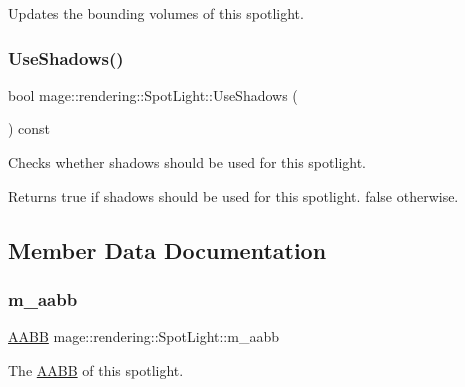 Updates the bounding volumes of this spotlight. \hypertarget{classmage_1_1rendering_1_1_spot_light_a5081e3b99bd869d6c241b48666917cd4}{}\label{classmage_1_1rendering_1_1_spot_light_a5081e3b99bd869d6c241b48666917cd4} 
\subsubsection{\texorpdfstring{Use\+Shadows()}{UseShadows()}}
{\footnotesize\ttfamily bool mage\+::rendering\+::\+Spot\+Light\+::\+Use\+Shadows (\begin{DoxyParamCaption}{ }\end{DoxyParamCaption}) const\hspace{0.3cm}{\ttfamily [noexcept]}}

Checks whether shadows should be used for this spotlight.

\begin{DoxyReturn}{Returns}
{\ttfamily true} if shadows should be used for this spotlight. {\ttfamily false} otherwise. 
\end{DoxyReturn}


\subsection{Member Data Documentation}
\hypertarget{classmage_1_1rendering_1_1_spot_light_a8d79d322ce7d394d4de201478350d795}{}\label{classmage_1_1rendering_1_1_spot_light_a8d79d322ce7d394d4de201478350d795} 
\subsubsection{\texorpdfstring{m\+\_\+aabb}{m\_aabb}}
{\footnotesize\ttfamily \hyperlink{classmage_1_1_a_a_b_b}{A\+A\+BB} mage\+::rendering\+::\+Spot\+Light\+::m\+\_\+aabb\hspace{0.3cm}{\ttfamily [private]}}

The \hyperlink{classmage_1_1_a_a_b_b}{A\+A\+BB} of this spotlight. \hypertarget{classmage_1_1rendering_1_1_spot_light_a79bbd00a892a19738361a52ed875f906}{}\label{classmage_1_1rendering_1_1_spot_light_a79bbd00a892a19738361a52ed875f906} 
